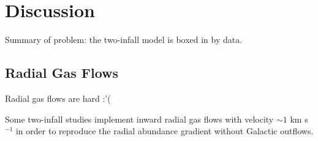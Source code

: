 \documentclass[twocolumn,twocolappendix,linenumbers]{aastex631}
\newcommand{\todo}[1]{{\color{red}#1}}
\begin{document}
\section{Discussion}
\label{sec:discussion}

\todo{Summary of problem: the two-infall model is boxed in by data.}




\subsection{Radial Gas Flows}
\label{sec:radial-flows}

\todo{Radial gas flows are hard :'(}

Some two-infall studies \citep[e.g.,][]{spitoni_effects_2011,palla_chemical_2020,palla_mapping_2024} implement inward radial gas flows with velocity $\sim1$ km s$^{-1}$ in order to reproduce the radial abundance gradient without Galactic outflows.
\end{document}
